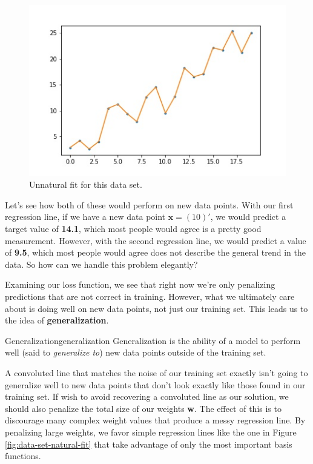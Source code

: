 \begin{figure}
    \centering
    \includegraphics[width=0.5\paperwidth]{../LinearRegression/fig/data_set_unnatural_fit_GEN.jpg}
    \caption{Unnatural fit for this data set.}
    \label{fig:data-set-unnatural-fit}
\end{figure}

Let's see how both of these would perform on new data points. With our first regression line, if we have a new data point $\textbf{x} = (10)'$, we would predict a target value of \textbf{14.1}, which most people would agree is a pretty good measurement. However, with the second regression line, we would predict a value of \textbf{9.5}, which most people would agree does not describe the general trend in the data. So how can we handle this problem elegantly?

Examining our loss function, we see that right now we're only penalizing predictions that are not correct in training. However, what we ultimately care about is doing well on new data points, not just our training set. This leads us to the idea of \textbf{generalization}.

\begin{definition}{Generalization}{generalization}
    Generalization is the ability of a model to perform well (said to \textit{generalize to}) new data points outside of the training set.
\end{definition}

A convoluted line that matches the noise of our training set exactly isn't going to generalize well to new data points that don't look exactly like those found in our training set. If wish to avoid recovering a convoluted line as our solution, we should also penalize the total size of our weights \textbf{w}. The effect of this is to discourage many complex weight values that produce a messy regression line. By penalizing large weights, we favor simple regression lines like the one in Figure \ref{fig:data-set-natural-fit} that take advantage of only the most important basis functions.

